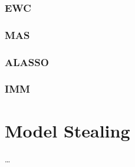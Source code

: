 \subsubsection{EWC}
\subsubsection{MAS}
\subsubsection{ALASSO}
\subsubsection{IMM}



\section{Model Stealing}
\label{sec:Related_work:Model_Stealing}

\dots
